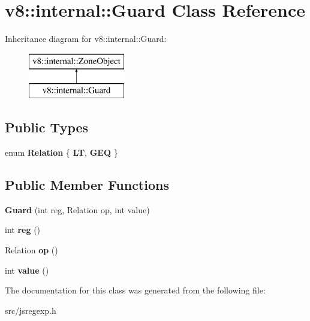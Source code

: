 \hypertarget{classv8_1_1internal_1_1_guard}{}\section{v8\+:\+:internal\+:\+:Guard Class Reference}
\label{classv8_1_1internal_1_1_guard}
Inheritance diagram for v8\+:\+:internal\+:\+:Guard\+:\begin{figure}[H]
\begin{center}
\leavevmode
\includegraphics[height=2.000000cm]{classv8_1_1internal_1_1_guard}
\end{center}
\end{figure}
\subsection*{Public Types}
\begin{DoxyCompactItemize}
\item 
\hypertarget{classv8_1_1internal_1_1_guard_a44b79b60fa04620a19805724d7372284}{}enum {\bfseries Relation} \{ {\bfseries L\+T}, 
{\bfseries G\+E\+Q}
 \}\label{classv8_1_1internal_1_1_guard_a44b79b60fa04620a19805724d7372284}

\end{DoxyCompactItemize}
\subsection*{Public Member Functions}
\begin{DoxyCompactItemize}
\item 
\hypertarget{classv8_1_1internal_1_1_guard_a1852d4717d48fa87b5cc7cac576dd56d}{}{\bfseries Guard} (int reg, Relation op, int value)\label{classv8_1_1internal_1_1_guard_a1852d4717d48fa87b5cc7cac576dd56d}

\item 
\hypertarget{classv8_1_1internal_1_1_guard_adc12b180ae664af6f07fdc95c9f7c4a3}{}int {\bfseries reg} ()\label{classv8_1_1internal_1_1_guard_adc12b180ae664af6f07fdc95c9f7c4a3}

\item 
\hypertarget{classv8_1_1internal_1_1_guard_a5333a5b7ae284bfecb111dd6b1e59463}{}Relation {\bfseries op} ()\label{classv8_1_1internal_1_1_guard_a5333a5b7ae284bfecb111dd6b1e59463}

\item 
\hypertarget{classv8_1_1internal_1_1_guard_aaa76818527880f43a2bb9b7e9aa03fe1}{}int {\bfseries value} ()\label{classv8_1_1internal_1_1_guard_aaa76818527880f43a2bb9b7e9aa03fe1}

\end{DoxyCompactItemize}


The documentation for this class was generated from the following file\+:\begin{DoxyCompactItemize}
\item 
src/jsregexp.\+h\end{DoxyCompactItemize}
